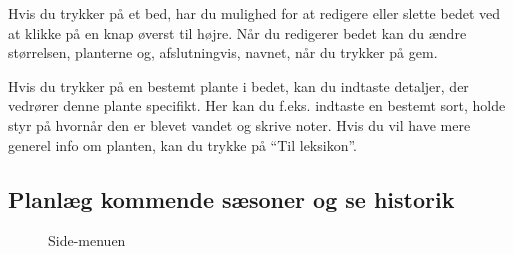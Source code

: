 \begin{minipage}{0.5\textwidth}
Hvis du trykker på et bed, har du mulighed for at redigere eller slette bedet ved at klikke på en knap øverst til højre. Når du redigerer bedet kan du ændre størrelsen, planterne og, afslutningvis, navnet, når du trykker på gem. 

Hvis du trykker på en bestemt plante i bedet, kan du indtaste detaljer, der vedrører denne plante specifikt. Her kan du f.eks. indtaste en bestemt sort, holde styr på hvornår den er blevet vandet og skrive noter. Hvis du vil have mere generel info om planten, kan du trykke på ``Til leksikon''.
\end{minipage}

\subsection{Planlæg kommende sæsoner og se historik}
\begin{minipage}{0.4\textwidth}
\begin{figure}[H]
    \centering
    \caption{Side-menuen}
\end{figure}
\end{minipage} \hfill
